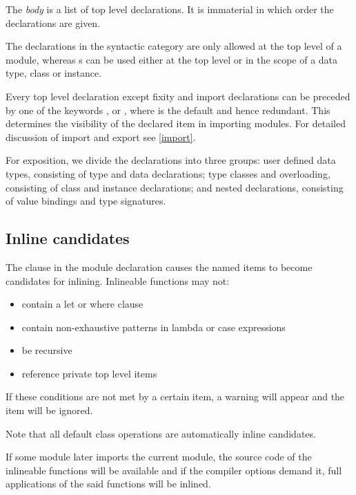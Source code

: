 
The \emph{body} is a list of top level declarations. It is immaterial in which order the declarations are given.

The declarations in the syntactic category  are only allowed at the top level of a \frege{} module, whereas s can be used either at the top level or in the scope of a data type, class or instance.

Every top level declaration except fixity and import declarations can be preceded by one of the keywords ,  or , where  is the default and hence redundant. This determines the visibility of the declared item in importing modules. For detailed discussion of import and export see \autoref{import}.

For exposition, we divide the declarations into three groups: user defined data types, consisting of type and data declarations; type classes and overloading, consisting of class and instance declarations; and nested declarations, consisting of value bindings and type signatures.

\subsection*{Inline candidates}

The  clause in the module declaration causes the named items to become candidates for inlining. Inlineable functions may not:

\begin{itemize}
\item contain a let or where clause
\item contain non-exhaustive patterns in lambda or case expressions
\item be recursive
\item reference private top level items
\end{itemize}

If these conditions are not met by a certain item, a warning will appear and the item will be ignored.

Note that all default class operations are automatically inline candidates.

If some module later imports the current module, the source code of the inlineable functions will be available and if the compiler options demand it, full applications of the said functions will be inlined.

